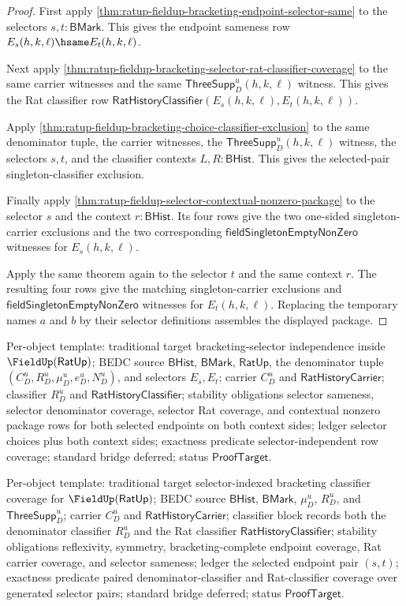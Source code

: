 \begin{proof}
First apply \autoref{thm:ratup-fieldup-bracketing-endpoint-selector-same} to the
selectors $s,t:\mathsf{BMark}$. This gives the endpoint sameness row
$E_s(h,k,\ell)\hsame E_t(h,k,\ell)$.

Next apply
\autoref{thm:ratup-fieldup-bracketing-selector-rat-classifier-coverage} to the
same carrier witnesses and the same $\mathsf{ThreeSupp}_D^u(h,k,\ell)$
witness. This gives the Rat classifier row
$\mathsf{RatHistoryClassifier}(E_s(h,k,\ell),E_t(h,k,\ell))$.

Apply \autoref{thm:ratup-fieldup-bracketing-choice-classifier-exclusion} to
the same denominator tuple, the carrier witnesses, the
$\mathsf{ThreeSupp}_D^u(h,k,\ell)$ witness, the selectors $s,t$, and the
classifier contexts $L,R:\mathsf{BHist}$. This gives the selected-pair
singleton-classifier exclusion.

Finally apply \autoref{thm:ratup-fieldup-selector-contextual-nonzero-package} to
the selector $s$ and the context $r:\mathsf{BHist}$. Its four rows give the two
one-sided singleton-carrier exclusions and the two corresponding
$\mathsf{fieldSingletonEmptyNonZero}$ witnesses for $E_s(h,k,\ell)$.

Apply the same theorem again to the selector $t$ and the same context $r$. The
resulting four rows give the matching singleton-carrier exclusions and
$\mathsf{fieldSingletonEmptyNonZero}$ witnesses for $E_t(h,k,\ell)$. Replacing
the temporary names $a$ and $b$ by their selector definitions assembles the
displayed package.
\end{proof}

Per-object template: traditional target bracketing-selector independence inside
$\FieldUp(\mathsf{RatUp})$; BEDC source $\mathsf{BHist}$, $\mathsf{BMark}$,
$\mathsf{RatUp}$, the denominator tuple $(C_D^u,R_D^u,\mu_D^u,e_D^u,N_D^u)$,
and selectors $E_s,E_t$; carrier $C_D^u$ and $\mathsf{RatHistoryCarrier}$;
classifier $R_D^u$ and $\mathsf{RatHistoryClassifier}$; stability obligations
selector sameness, selector denominator coverage, selector Rat coverage, and
contextual nonzero package rows for both selected endpoints on both context
sides; ledger selector choices plus both context sides; exactness predicate
selector-independent row coverage; standard bridge deferred; status
$\mathsf{ProofTarget}$.

Per-object template: traditional target selector-indexed bracketing classifier
coverage for $\FieldUp(\mathsf{RatUp})$; BEDC source $\mathsf{BHist}$,
$\mathsf{BMark}$, $\mu_D^u$, $R_D^u$, and $\mathsf{ThreeSupp}_D^u$; carrier
$C_D^u$ and $\mathsf{RatHistoryCarrier}$; classifier block records both the
denominator classifier $R_D^u$ and the Rat classifier
$\mathsf{RatHistoryClassifier}$; stability obligations reflexivity, symmetry,
bracketing-complete endpoint coverage, Rat carrier coverage, and selector
sameness; ledger the selected endpoint pair $(s,t)$; exactness predicate paired
denominator-classifier and Rat-classifier coverage over generated selector
pairs; standard bridge deferred; status $\mathsf{ProofTarget}$.
